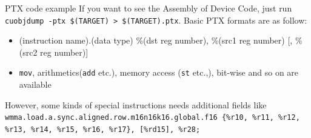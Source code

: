 \documentclass[dvipdfmx, 11pt, aspectratio=169]{beamer}   %
\begin{document}
\begin{frame}[fragile]{PTX code example}
If you want to see the Assembly of Device Code, just run \lstinline|cuobjdump -ptx $(TARGET) > $(TARGET).ptx|.
Basic PTX formats are as follow:
\begin{itemize}
  \item (instruction name).(data type) \%(dst reg number), \%(src1 reg number) [, \%(src2 reg number)]
  \item \lstinline|mov|, arithmetics(\lstinline|add| etc.), memory access (\lstinline|st| etc.,), bit-wise and so on are available 
\end{itemize}
However, some kinds of special instructions needs additional fields like
\lstinline|wmma.load.a.sync.aligned.row.m16n16k16.global.f16 {%r10, %r11, %r12, %r13, %r14, %r15, %r16, %r17}, [%rd15], %r28;|
\end{frame}
\end{document}
